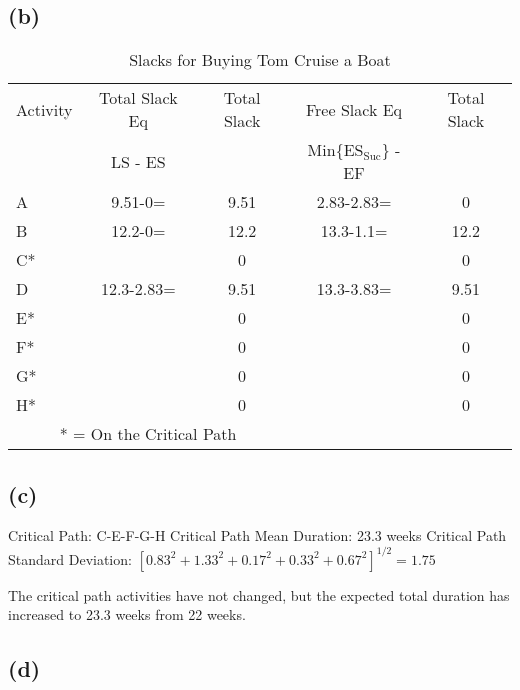 \documentclass{article}
\begin{document}
	\begin{center}
	\makebox[\textwidth]{
		}
	\end{center}
	\subsection*{(b)}
	{\renewcommand{\arraystretch}{1.2} 
	\begin{table}[h!tbp]
  		\begin{center}
    		\caption{Slacks for Buying Tom Cruise a Boat}
    		\label{tab:table2}
			
    		\begin{tabular}{lcccc}
				Activity & Total Slack Eq & Total Slack & Free Slack Eq & Total Slack\\
				& LS - ES & & Min\{ES$_{\text{Suc}}$\} - EF & \\
				\hline
      			A & 9.51-0= & 9.51 & 2.83-2.83=& 0\\
      			B & 12.2-0= & 12.2 & 13.3-1.1= & 12.2\\
				C* && 0 && 0\\
				D & 12.3-2.83= & 9.51 & 13.3-3.83= & 9.51\\
				E* && 0 && 0\\
				F* && 0 && 0\\
				G* && 0 && 0\\
				H* && 0 && 0\\
				\hline
				\multicolumn{3}{c}{* = On the Critical Path}\\
    		\end{tabular}
  		\end{center}
	\end{table}
	}
	\subsection*{(c)}
	\noindent Critical Path: C-E-F-G-H\newline
	Critical Path Mean Duration: 23.3 weeks\newline
	Critical Path Standard Deviation: $[0.83^2 + 1.33^2 + 0.17^2 + 0.33^2 + 0.67^2]^{1/2} = 1.75$
	\newline
	
	\noindent The critical path activities have not changed, but the expected total duration has increased to 23.3 weeks from 22 weeks. 
	\subsection*{(d)}
	
\end{document}
